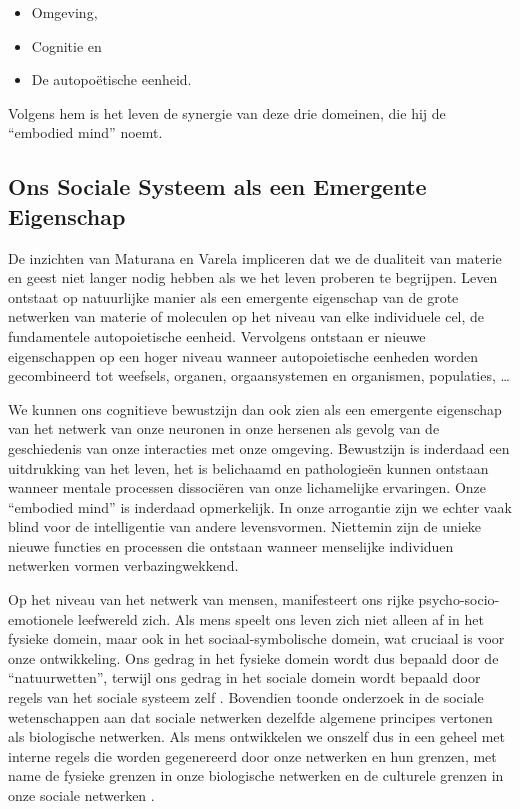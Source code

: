 \documentclass[
  11pt,
]{book}
\providecommand{\tightlist}{%
  \setlength{\itemsep}{0pt}\setlength{\parskip}{0pt}}
\begin{document}
\begin{itemize}
\tightlist
\item
  Omgeving,
\item
  Cognitie en
\item
  De autopoëtische eenheid.
\end{itemize}

Volgens hem is het leven de synergie van deze drie domeinen, die hij de ``embodied mind'' noemt.

\hypertarget{ons-sociale-systeem-als-een-emergente-eigenschap}{%
\subsection{Ons Sociale Systeem als een Emergente Eigenschap}\label{ons-sociale-systeem-als-een-emergente-eigenschap}}

De inzichten van Maturana en Varela impliceren dat we de dualiteit van materie en geest niet langer nodig hebben als we het leven proberen te begrijpen. Leven ontstaat op natuurlijke manier als een emergente eigenschap van de grote netwerken van materie of moleculen op het niveau van elke individuele cel, de fundamentele autopoietische eenheid. Vervolgens ontstaan er nieuwe eigenschappen op een hoger niveau wanneer autopoietische eenheden worden gecombineerd tot weefsels, organen, orgaansystemen en organismen, populaties, \ldots{}

We kunnen ons cognitieve bewustzijn dan ook zien als een emergente eigenschap van het netwerk van onze neuronen in onze hersenen als gevolg van de geschiedenis van onze interacties met onze omgeving. Bewustzijn is inderdaad een uitdrukking van het leven, het is belichaamd en pathologieën kunnen ontstaan wanneer mentale processen dissociëren van onze lichamelijke ervaringen. Onze ``embodied mind'' is inderdaad opmerkelijk. In onze arrogantie zijn we echter vaak blind voor de intelligentie van andere levensvormen. Niettemin zijn de unieke nieuwe functies en processen die ontstaan wanneer menselijke individuen netwerken vormen verbazingwekkend.

Op het niveau van het netwerk van mensen, manifesteert ons rijke psycho-socio-emotionele leefwereld zich. Als mens speelt ons leven zich niet alleen af in het fysieke domein, maar ook in het sociaal-symbolische domein, wat cruciaal is voor onze ontwikkeling. Ons gedrag in het fysieke domein wordt dus bepaald door de ``natuurwetten'', terwijl ons gedrag in het sociale domein wordt bepaald door regels van het sociale systeem zelf \citep{capraLuisi2014}. Bovendien toonde onderzoek in de sociale wetenschappen aan dat sociale netwerken dezelfde algemene principes vertonen als biologische netwerken. Als mens ontwikkelen we onszelf dus in een geheel met interne regels die worden gegenereerd door onze netwerken en hun grenzen, met name de fysieke grenzen in onze biologische netwerken en de culturele grenzen in onze sociale netwerken \citep{capraLuisi2014}.
\end{document}
